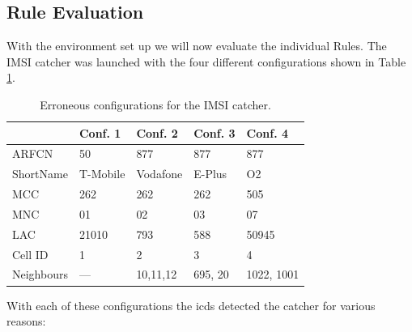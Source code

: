 \subsection{Rule Evaluation}
With the environment set up we will now evaluate the individual Rules.
The IMSI catcher was launched with the four different configurations shown in Table \ref{tab:err_configs}.
\begin{table}
\centering
\begin{tabular}{lllll}
\toprule
			&Conf. 1		&Conf. 2		&Conf. 3		&Conf. 4\\
\midrule
ARFCN		&50				&877			&877			&877	\\
ShortName	&T-Mobile		&Vodafone		&E-Plus			&O2		\\
MCC			&262			&262			&262			&505	\\
MNC			&01				&02				&03				&07	\\
LAC			&21010			&793			&588			&50945	\\
Cell ID		&1				&2				&3				&4		\\
Neighbours	&---			&10,11,12		&695, 20		&1022, 1001 \\
\bottomrule
\end{tabular}
\caption{Erroneous configurations for the IMSI catcher.}
\label{tab:err_configs}
\end{table}
With each of these configurations the \gls{icds} detected the catcher for various reasons:
